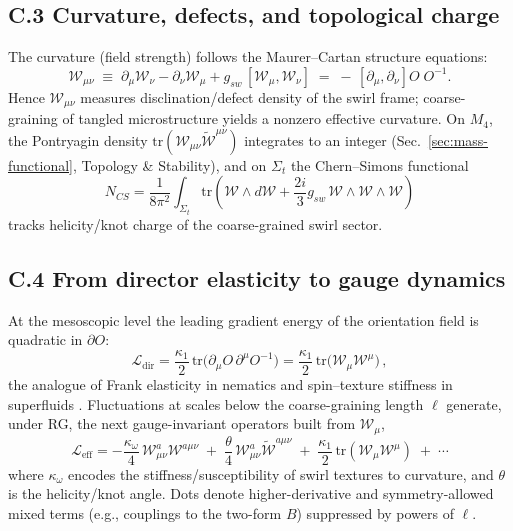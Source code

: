 \documentclass[smallextended]{svjour3}       %
\begin{document}
		\subsection*{C.3 Curvature, defects, and topological charge}
		The curvature (field strength) follows the Maurer–Cartan structure equations:
		\[
		\boxed{\quad \mathcal{W}_{\mu\nu} \;\equiv\; \partial_\mu \mathcal{W}_\nu - \partial_\nu \mathcal{W}_\mu
		+ g_{\!sw}\,[\mathcal{W}_\mu,\mathcal{W}_\nu] \;=\; -\,[\partial_\mu,\partial_\nu]O\;O^{-1}. \quad}
		\]
		Hence \(\mathcal{W}_{\mu\nu}\) measures disclination/defect density of the swirl frame; coarse-graining of tangled microstructure yields a nonzero effective curvature.
		On \(M_4\), the Pontryagin density \(\mathrm{tr}(\mathcal{W}_{\mu\nu}\tilde{\mathcal{W}}^{\mu\nu})\) integrates to an integer (Sec.~\ref{sec:mass-functional}, Topology \& Stability), and on \(\Sigma_t\) the Chern–Simons functional
		\[
		N_{\!CS}=\frac{1}{8\pi^2}\int_{\Sigma_t}\mathrm{tr}\!\left(\mathcal{W}\wedge d\mathcal{W}+\frac{2i}{3}g_{\!sw}\,\mathcal{W}\wedge\mathcal{W}\wedge\mathcal{W}\right)
		\]
		tracks helicity/knot charge of the coarse-grained swirl sector.

		\subsection*{C.4 From director elasticity to gauge dynamics}
		At the mesoscopic level the leading gradient energy of the orientation field is quadratic in \(\partial O\):
		\[
		\mathcal{L}_{\text{dir}}=\frac{\kappa_1}{2}\,\mathrm{tr}\big(\partial_\mu O\,\partial^\mu O^{-1}\big)
		= \frac{\kappa_1}{2}\,\mathrm{tr}\big(\mathcal{W}_\mu \mathcal{W}^\mu\big) \,,
		\]
		the analogue of Frank elasticity in nematics and spin–texture stiffness in superfluids \cite{Volovik2009,Lubensky2002,Ho1998}.
		Fluctuations at scales below the coarse-graining length \(\ell\) generate, under RG, the next gauge-invariant operators built from \(\mathcal{W}_\mu\),
		\[
		\boxed{\quad
		\mathcal{L}_{\text{eff}} = -\frac{\kappa_\omega}{4}\,\mathcal{W}_{\mu\nu}^a\mathcal{W}^{a\mu\nu}
		\;+\;\frac{\theta}{4}\,\mathcal{W}_{\mu\nu}^a\tilde{\mathcal{W}}^{a\mu\nu}
		\;+\;\frac{\kappa_1}{2}\,\mathrm{tr}(\mathcal{W}_\mu \mathcal{W}^\mu)\;+\;\cdots \quad}
		\]
		where \(\kappa_\omega\) encodes the stiffness/susceptibility of swirl textures to curvature, and \(\theta\) is the helicity/knot angle. Dots denote higher-derivative and symmetry-allowed mixed terms (e.g., couplings to the two-form \(B\)) suppressed by powers of \(\ell\).
\end{document}
